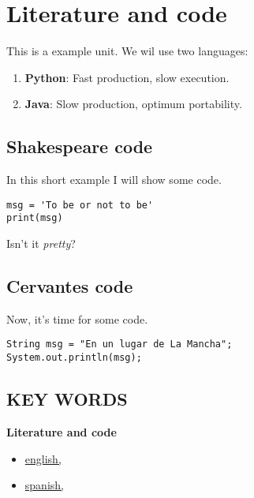 \maketitle
\tableofcontents

\newpage
\section{Literature and code}
\settoc
This is a example unit. We wil use two languages:

\begin{enumerate}
\item \textbf{ Python}: Fast production, slow execution.  
\item \textbf{ Java}: Slow production, optimum portability.
\end{enumerate}

\subsection{Shakespeare code}

In this short example I will show some \label{kw:english} code.

\lstset{language=Python}
\begin{lstlisting}
msg = 'To be or not to be'
print(msg)
\end{lstlisting}

\begin{center}

Isn't it \textit{pretty}?

\end{center}

\subsection{Cervantes code}

Now, it's time for some \label{kw:spanish} code.


\lstset{language=Java}
\begin{lstlisting}
String msg = "En un lugar de La Mancha";
System.out.println(msg);
\end{lstlisting}

\newpage

\begin{appendices}

\section{KEY WORDS}

\noindent\textbf{Literature and code
}
\begin{multicols}{3}
\begin{itemize}[label={}]
    \item \hyperref[kw:english]{english, \pageref*{kw:english}}
    \item \hyperref[kw:spanish]{spanish, \pageref*{kw:spanish}}
\end{itemize}
\end{multicols}

\end{appendices}
